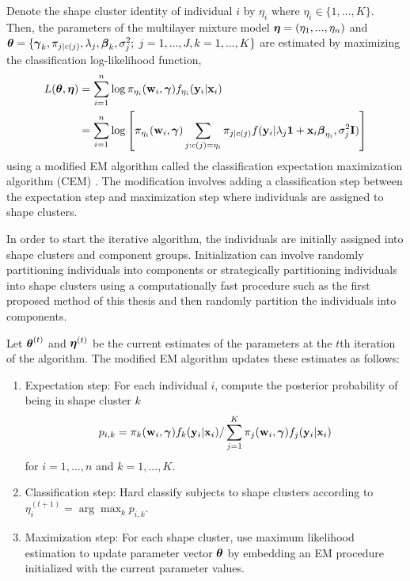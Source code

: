 Denote the shape cluster identity of individual $i$ by $\eta_{i}$ where $\eta_{i}\in\{1,...,K\}$. Then, the parameters of the multilayer mixture model $\boldsymbol\eta=(\eta_{1},...,\eta_{n})$ and $\boldsymbol\theta=\{\boldsymbol \gamma_{k}, \pi_{j|c(j)},\lambda_{j}, \boldsymbol\beta_{k},\sigma^{2}_{j};\; j=1,...,J, k=1,...,K\}$  are estimated by maximizing the classification log-likelihood function,
\begin{align}
 L(\boldsymbol\theta,\boldsymbol\eta) &= \sum^{n}_{i=1} \log \pi_{\eta_{i}}(\mathbf w_{i},\boldsymbol\gamma) f_{\eta_{i}}(\mathbf y_{i}|\mathbf x_{i})\nonumber\\
\label{ll}& =  \sum^{n}_{i=1} \log\left[ \pi_{\eta_{i}}(\mathbf w_{i},\boldsymbol\gamma)  \sum_{j: c(j) = \eta_{i}} \pi_{j|c(j)}f(\mathbf y_{i}|\lambda_{j}\mathbf 1 + \mathbf x_{i}\boldsymbol\beta_{\eta_{i}},\sigma^{2}_{j}\mathbf I)\right]
\end{align} 
using a modified EM algorithm called the classification expectation maximization algorithm (CEM) \cite{celeux1992, mclachlan2000}. The modification involves adding a classification step between the expectation step and maximization step where individuals are assigned to shape clusters. 

In order to start the iterative algorithm, the individuals are initially assigned into shape clusters and component groups. Initialization can involve randomly partitioning individuals into components or strategically partitioning individuals into shape clusters using a computationally fast procedure such as the first proposed method of this thesis and then randomly partition the individuals into components. 

Let $\boldsymbol\theta^{(t)}$ and $\boldsymbol\eta^{(t)}$ be the current estimates of the parameters at the $t$th iteration of the algorithm. The modified EM algorithm updates these estimates as follows:
\begin{enumerate}
\item Expectation step: For each individual $i$, compute the posterior probability of being in shape cluster $k$
$$p_{i,k}= \pi_{k}(\mathbf w_{i},\boldsymbol\gamma)f_{k}(\mathbf y_{i}|\mathbf x_{i})/\sum^{K}_{j=1} \pi_{j}(\mathbf w_{i},\boldsymbol\gamma)f_{j}(\mathbf y_{i}|\mathbf x_{i})$$
for $i=1,...,n$ and $k=1,...,K$.
\item Classification step: Hard classify subjects to shape clusters according to $\eta^{(t+1)}_{i} = \arg\max_{k} p_{i,k}$.
\item Maximization step: For each shape cluster, use maximum likelihood estimation to update parameter vector $\boldsymbol\theta$ by embedding an EM procedure initialized with the current parameter values.
\end{enumerate} 

